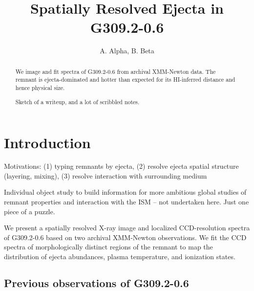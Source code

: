\documentclass[preprint2,tighten,trackchanges]{aastex6}
\newcommand*{\tsup}{\textsuperscript}
\begin{document}
\title{Spatially Resolved Ejecta in G309.2-0.6}

\author{
A. Alpha, B. Beta%
}




\begin{abstract}
We image and fit spectra of G309.2-0.6 from archival XMM-Newton data.
The remnant is ejecta-dominated and hotter than expected for its HI-inferred
distance and hence physical size.

Sketch of a writeup, and a lot of scribbled notes.
\end{abstract}


\section{Introduction} \label{sec:intro}

Motivations:
(1) typing remnants by ejecta,
(2) resolve ejecta spatial structure (layering, mixing),
(3) resolve interaction with surrounding medium

Individual object study to build information for more ambitious global studies
of remnant properties and interaction with the ISM -- not undertaken here.
Just one piece of a puzzle.

We present a spatially resolved X-ray image and localized CCD-resolution
spectra of G309.2-0.6 based on two archival XMM-Newton observations.
We fit the CCD spectra of morphologically distinct regions of the remnant to
map the distribution of ejecta abundances, plasma temperature, and ionization
states.


\subsection{Previous observations of G309.2-0.6}
\end{document}
